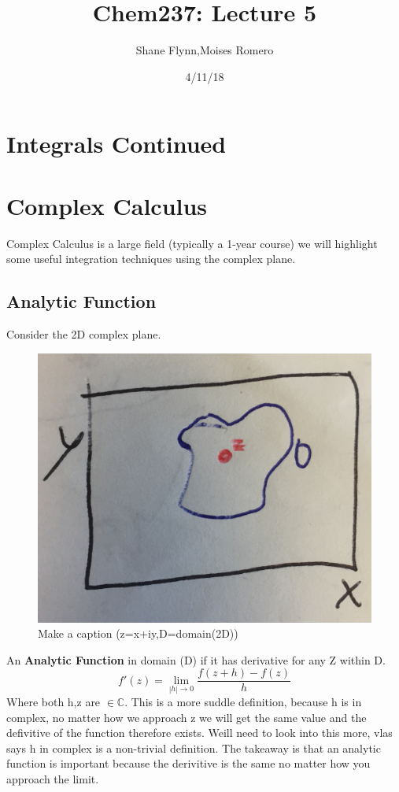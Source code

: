\documentclass{article}
\title{Chem237: Lecture 5}
\date{4/11/18}
\author{Shane Flynn,Moises Romero}
\newcommand{\be}{\begin{equation}}
\newcommand{\ee}{\end{equation}}
\begin{document}
\maketitle
\section*{Integrals Continued}
\section*{Complex Calculus }
Complex Calculus is a large field (typically a 1-year course) we will highlight some useful integration techniques using the complex plane. 

\subsection*{Analytic Function}
Consider the 2D complex plane. 
\begin{figure}[h]
  \centering
  \includegraphics[scale=0.2]{Figures/complex.png}
    \caption{Make a caption (z=x+iy,D=domain(2D))}
  \label{fig:under_damped}
\end{figure}
An \textbf{Analytic Function} in domain (D) if it has derivative for any Z within D.
\be
f'(z) = \lim_{|h|\to 0} \frac{f(z+h)-f(z)}{h}
\ee
Where both h,z are $\in \mathbb{C}$. This is a more suddle definition, because h is in complex, no matter how we approach z we will get the same value and the defivitive of the function therefore exists. Weill need to look into this more, vlas says h in complex is a non-trivial definition. 
The takeaway is that an analytic function is important because the derivitive is the same no matter how you approach the limit. 
\end{document}
